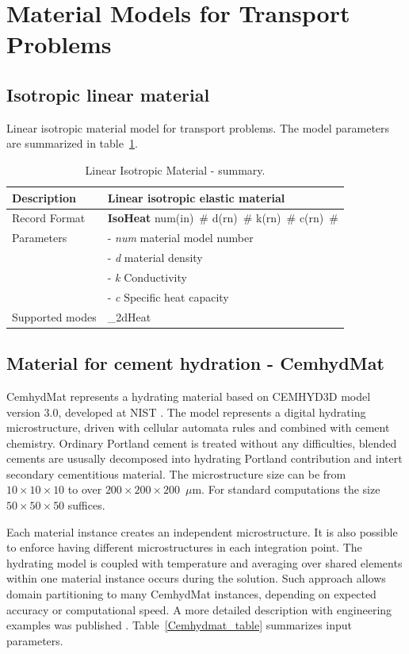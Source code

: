 \documentclass[a4paper]{article}
\newcommand{\descitem}[1]{{\noindent \bf #1}}
\newcommand{\elemparam}[2]{{{#1\tiny (#2)}~\#}}
\newcommand{\param}[1]{{\it #1}}
\begin{document}
\clearpage

\section{Material Models for Transport Problems}
\subsection{Isotropic linear material}
\label{IsoLET}
Linear isotropic material model for transport problems. The model parameters are summarized
in table~\ref{Isoheat_table}.

\begin{table}[!htb]
\begin{tabular}{|l|p{9cm}|}
\hline
Description & Linear isotropic elastic material\\
\hline
Record Format & \descitem{IsoHeat} \elemparam{num}{in}
\elemparam{d}{rn} \elemparam{k}{rn} \elemparam{c}{rn}\\
Parameters &- \param{num} material model number\\
&- \param{d} material density\\
&- \param{k} Conductivity\\
&- \param{c} Specific heat capacity\\
Supported modes& \_2dHeat\\
\hline
\end{tabular}
\caption{Linear Isotropic Material - summary.}
\label{Isoheat_table}
\end{table}

\subsection{Material for cement hydration - CemhydMat}
\label{Cemhyd}
CemhydMat represents a hydrating material based on CEMHYD3D model version 3.0,
developed at NIST \cite{NISTIR7232}. The model represents a digital hydrating
microstructure, driven with cellular automata rules and combined with cement
chemistry. Ordinary Portland cement is treated without any difficulties, blended
cements are ususally decomposed into hydrating Portland contribution and intert
secondary cementitious material. The microstructure size can be from
$10\times10\times10$ to over $200\times200\times200$~$\mu$m. For standard
computations the size $50\times50\times50$ suffices.

Each material instance creates an independent microstructure. It is also
possible to enforce having different microstructures in each integration point.
The hydrating model is coupled with temperature and averaging over shared
elements within one material instance occurs during the solution. Such approach
allows domain partitioning to many CemhydMat instances, depending on expected
accuracy or computational speed. A more detailed description with engineering
examples was published \cite{Smilauer:09}. Table~\ref{Cemhydmat_table} summarizes input parameters.
\end{document}
